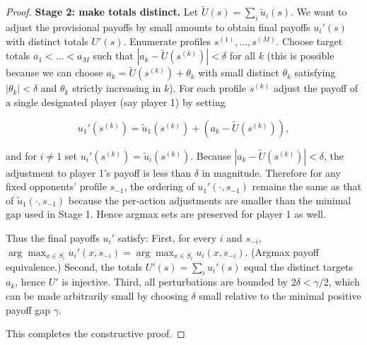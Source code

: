 \documentclass[10pt,a4paper]{amsart}
\begin{document}
\begin{proof}
\textbf{Stage 2: make totals distinct.} Let \(\tilde U(s)=\sum_i \tilde u_i(s)\).
We want to adjust the provisional payoffs by small amounts to obtain final
payoffs \(u_i'(s)\) with distinct totals \(U'(s)\). Enumerate profiles
\(s^{(1)},\dots,s^{(M)}\). Choose target totals \(a_1<\dots<a_M\) such that
\(|a_k-\tilde U(s^{(k)})|<\delta\) for all \(k\) (this is possible because
we can choose \(a_k=\tilde U(s^{(k)})+\theta_k\) with small distinct
\(\theta_k\) satisfying \(|\theta_k|<\delta\) and \(\theta_k\) strictly
increasing in \(k\)). For each profile \(s^{(k)}\) adjust the payoff of a
single designated player (say player 1) by setting


\[
u_1'(s^{(k)}) = \tilde u_1(s^{(k)}) + (a_k-\tilde U(s^{(k)})),
\]


and for \(i\ne 1\) set \(u_i'(s^{(k)})=\tilde u_i(s^{(k)})\). Because
\(|a_k-\tilde U(s^{(k)})|<\delta\), the adjustment to player 1's payoff is
less than \(\delta\) in magnitude. Therefore for any fixed opponents'
profile \(s_{-1}\), the ordering of \(u_1'(\cdot,s_{-1})\) remains the same
as that of \(\tilde u_1(\cdot,s_{-1})\) because the per‑action adjustments
are smaller than the minimal gap used in Stage 1. Hence argmax sets are
preserved for player 1 as well.

Thus the final payoffs \(u_i'\) satisfy:
First, for every \(i\) and \(s_{-i}\), \(\arg\max_{x\in S_i} u_i'(x,s_{-i})
    = \arg\max_{x\in S_i} u_i(x,s_{-i})\). (Argmax payoff equivalence.) Second, the totals \(U'(s)=\sum_i u_i'(s)\) equal the distinct targets \(a_k\),
    hence \(U'\) is injective. Third, all perturbations are bounded by \(2\delta<\gamma/2\), which can be
    made arbitrarily small by choosing \(\delta\) small relative to the
    minimal positive payoff gap \(\gamma\).

This completes the constructive proof.
\end{proof}
\end{document}
